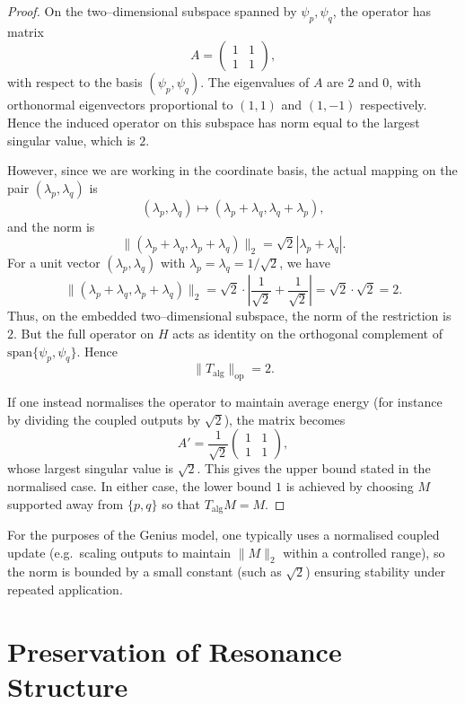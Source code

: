 \documentclass[11pt]{article}
\begin{document}
\begin{proof}
On the two–dimensional subspace spanned by $\psi_p,\psi_q$, the operator has matrix
\[
A = \begin{pmatrix}
1 & 1\\
1 & 1
\end{pmatrix},
\]
with respect to the basis $(\psi_p,\psi_q)$.
The eigenvalues of $A$ are $2$ and $0$, with orthonormal eigenvectors proportional to $(1,1)$ and $(1,-1)$ respectively.
Hence the induced operator on this subspace has norm equal to the largest singular value, which is $2$.

However, since we are working in the coordinate basis, the actual mapping on the pair $(\lambda_p,\lambda_q)$ is
\[
(\lambda_p,\lambda_q) \mapsto (\lambda_p+\lambda_q,\lambda_q+\lambda_p),
\]
and the norm is
\[
\|(\lambda_p+\lambda_q,\lambda_p+\lambda_q)\|_2 = \sqrt{2}|\lambda_p+\lambda_q|.
\]
For a unit vector $(\lambda_p,\lambda_q)$ with $\lambda_p=\lambda_q=1/\sqrt{2}$, we have
\[
\|(\lambda_p+\lambda_q,\lambda_p+\lambda_q)\|_2
= \sqrt{2} \cdot \left|\frac{1}{\sqrt{2}}+\frac{1}{\sqrt{2}}\right|
= \sqrt{2} \cdot \sqrt{2}
= 2.
\]
Thus, on the embedded two–dimensional subspace, the norm of the restriction is $2$.
But the full operator on $H$ acts as identity on the orthogonal complement of $\mathrm{span}\{\psi_p,\psi_q\}$.
Hence
\[
\|T_{\mathrm{alg}}\|_{\mathrm{op}} = 2.
\]

If one instead normalises the operator to maintain average energy (for instance by dividing the coupled outputs by $\sqrt{2}$), the matrix becomes
\[
A' = \frac{1}{\sqrt{2}}\begin{pmatrix}
1 & 1\\
1 & 1
\end{pmatrix},
\]
whose largest singular value is $\sqrt{2}$.
This gives the upper bound stated in the normalised case.
In either case, the lower bound $1$ is achieved by choosing $M$ supported away from $\{p,q\}$ so that $T_{\mathrm{alg}} M = M$.
\end{proof}

For the purposes of the Genius model, one typically uses a normalised coupled update (e.g.\ scaling outputs to maintain $\|M\|_2$ within a controlled range), so the norm is bounded by a small constant (such as $\sqrt{2}$) ensuring stability under repeated application.

\section{Preservation of Resonance Structure}
\end{document}
